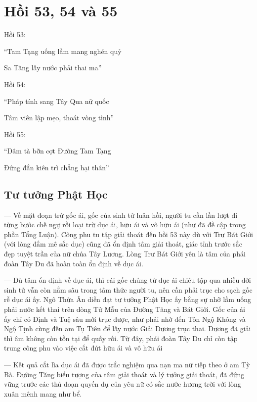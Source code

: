 \chapter{Hồi 53, 54 và 55} %
\label{cha:hoi_53_54}

Hồi 53:

\begin{itshape}
``Tam Tạng uống lầm mang nghén quỷ

Sa Tăng lấy nước phải thai ma''
\end{itshape}

Hồi 54:

\begin{itshape}
``Pháp tính sang Tây Qua nữ quốc

Tâm viên lập mẹo, thoát vòng tình''
\end{itshape}

Hồi 55:

\begin{itshape}
``Dâm tà bỡn cợt Đường Tam Tạng

Đứng đắn kiên trì chẳng hại thân''
\end{itshape}

\section{Tư tưởng Phật Học} %
\label{sec:53_54_phat_hoc}

— Về mặt đoạn trừ gốc ái, gốc của sinh tử luân hồi, người tu cần lần lượt đi từng bước chế ngự rồi loại trừ dục ái, hữu ái và vô hữu ái (như đã đề cập trong phần Tổng Luận). Công phu tu tập giải thoát đến hồi 53 này dù với Trư Bát Giới (với lòng đắm mê sắc dục) cũng đã ổn định tâm giải thoát, giác tỉnh trước sắc đẹp tuyệt trần của nữ chúa Tây Lương. Lòng Trư Bát Giới yên là tâm của phái đoàn Tây Du đã hoàn toàn ổn định về dục ái.

— Dù tâm ổn định về dục ái, thì cái gốc chủng tử dục ái chiêu tập qua nhiều đời sinh tử vẫn còn nằm sâu trong tâm thức người tu, nên cần phải trục cho sạch gốc rễ dục ái ấy. Ngô Thừa Ân diễn đạt tư tưởng Phật Học ấy bằng sự nhỡ lầm uống phải nước kết thai trên dòng Tử Mẫu của Đường Tăng và Bát Giới. Gốc của ái ấy chỉ có Định và Tuệ sâu mới trục được, như phải nhờ đến Tôn Ngộ Không và Ngộ Tịnh cùng đến am Tụ Tiên để lấy nước Giải Dương trục thai. Dương đã giải thì âm không còn tồn tại để quấy rối. Từ đây, phái đoàn Tây Du chỉ còn tập trung công phu vào việc cắt đứt hữu ái và vô hữu ái

— Kết quả cắt lìa dục ái đã được trắc nghiệm qua nạn ma nữ tiếp theo ở am Tỳ Bà. Đường Tăng biểu tượng của tâm giải thoát và lý tưởng giải thoát, đã đứng vững trước các thủ đoạn quyến dụ của yêu nữ có sắc nước hương trời với lòng xuân mênh mang như bể.

